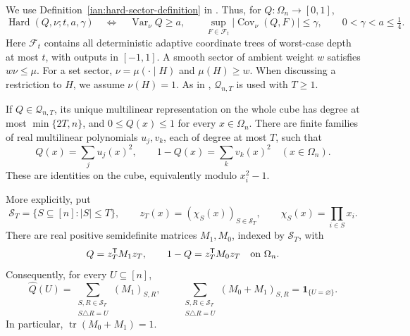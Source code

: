 We use Definition~\ref{ian:hard-sector-definition} in
.
Thus, for \(Q:\Omega_n\to[0,1]\),
\[
 \operatorname{Hard}(Q,\nu;t,a,\gamma)
 \quad\Longleftrightarrow\quad
 \operatorname{Var}_\nu Q\ge a,\qquad
 \sup_{F\in\mathcal F_t}
       |\operatorname{Cov}_\nu(Q,F)|\le\gamma,
 \qquad 0<\gamma<a\le\tfrac14.
\]
Here \(\mathcal F_t\) contains all deterministic adaptive coordinate
trees of worst-case depth at most \(t\), with outputs in \([-1,1]\).
A smooth sector of ambient weight \(w\) satisfies \(w\nu\le\mu\).
For a set sector, \(\nu=\mu(\cdot\mid H)\) and \(\mu(H)\ge w\).
When discussing a restriction to \(H\), we assume \(\nu(H)=1\).
As in , \(\mathcal Q_{n,T}\) is used with \(T\ge1\).

\begin{lemma}
\label{ian:pac-polynomial-sos}
If \(Q\in\mathcal Q_{n,T}\), its unique multilinear representation
on the whole cube has degree at most \(\min\{2T,n\}\), and
\(0\le Q(x)\le1\) for every \(x\in\Omega_n\).
There are finite families of real multilinear polynomials
\(u_j,v_k\), each of degree at most \(T\), such that
\[
 Q(x)=\sum_j u_j(x)^2,\qquad
 1-Q(x)=\sum_k v_k(x)^2
 \quad(x\in\Omega_n).
 \tag{32.1}\label{ian:pac-sos}
\]
These are identities on the cube, equivalently modulo
\(x_i^2-1\).

More explicitly, put
\[
 \mathcal S_T=\{S\subseteq[n]:|S|\le T\},
 \qquad z_T(x)=(\chi_S(x))_{S\in\mathcal S_T},
 \qquad \chi_S(x)=\prod_{i\in S}x_i.
\]
There are real positive semidefinite matrices \(M_1,M_0\), indexed
by \(\mathcal S_T\), with
\[
 Q=z_T^{\mathsf T}M_1z_T,\qquad
 1-Q=z_T^{\mathsf T}M_0z_T
 \quad\hbox{on }\Omega_n.
\]
Consequently, for every \(U\subseteq[n]\),
\[
 \widehat Q(U)
   =\sum_{\substack{S,R\in\mathcal S_T\\S\triangle R=U}}
       (M_1)_{S,R},
 \qquad
 \sum_{\substack{S,R\in\mathcal S_T\\S\triangle R=U}}
       (M_0+M_1)_{S,R}
   =\mathbf1_{\{U=\varnothing\}}.
 \tag{32.2}\label{ian:pac-sos-coefficients}
\]
In particular, \(\operatorname{tr}(M_0+M_1)=1\).
\end{lemma}

